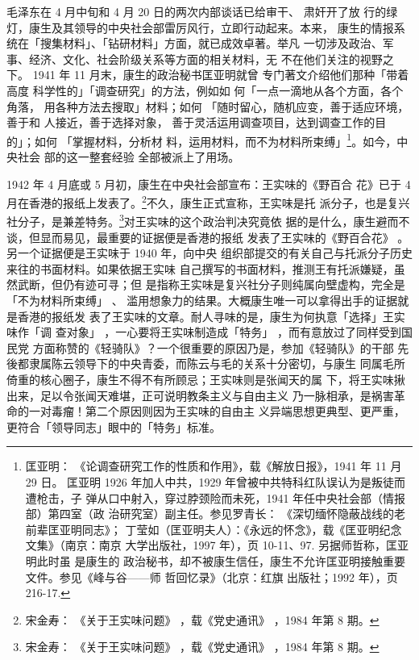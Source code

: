 毛泽东在 4 月中旬和 4 月 20 日的两次内部谈话已给审干、 肃奸开了放 行的绿
灯，康生及其领导的中央社会部雷厉风行，立即行动起来。本来， 康生的情报系
统在「搜集材料」、「钻研材料」方面，就已成效卓著。举凡  一切涉及政治、军
事、经济、文化、社会阶级关系等方面的相关材料，无 不在他们关注的视野之下。
1941 年 11 月末，康生的政治秘书匡亚明就曾 专门著文介绍他们那种「带着高度
科学性的」「调查研究」的方法，例如如 何「一点一滴地从各个方面，各个角落，
用各种方法去搜取」材料；如何 「随时留心，随机应变，善于适应环境，善于和
人接近，善于选择对象， 善于灵活运用调查项目，达到调查工作的目的」；如何
「掌握材料，分析材 料，运用材料，而不为材料所束缚」\footnote{匡亚明：
《论调查研究工作的性质和作用》，载《解放日报》，1941 年 11 月 29 日。
匡亚明 1926 年加人中共，1929 年曾被中共特科红队误认为是叛徒而遭枪击，子
弹从口中射入，穿过脖颈险而未死，1941 年任中央社会部（情报部）第四室（政
治研究室）副主任。参见罗青长： 《深切缅怀隐蔽战线的老前辈匡亚明同志》；
丁莹如（匡亚明夫人）：《永远的怀念》，载《匡亚明纪念文集》（南京：南京
大学出版社，1997 年），页 10-11、97. 另据师哲称，匡亚明此时虽 是康生的
政治秘书，却不被康生信任，康生不允许匡亚明接触重要文件。参见《峰与谷——师
哲回忆录》（北京：红旗 出版社；1992 年），页 216-17. }。如今，中央社会
部的这一整套经验 全部被派上了用场。

1942 年 4 月底或 5 月初，康生在中央社会部宣布：王实味的《野百合
花》已于 4 月在香港的报纸上发表了。\footnote{宋金寿：
《关于王实味问题》
，载《党史通讯》
，1984 年第 8 期。}不久，康生正式宣称，王实味是托
派分子，也是复兴社分子，是兼差特务。\footnote{宋金寿：
《关于王实味问题》
，载《党史通讯》
，1984 年第 8 期。}对王实味的这个政治判决究竟依
据的是什么，康生避而不谈，但显而易见，最重要的证据便是香港的报纸
发表了王实味的《野百合花》
。另一个证据便是王实味于 1940 年，向中央
组织部提交的有关自己与托派分子历史来往的书面材料。如果依据王实味
自己撰写的书面材料，推测王有托派嫌疑，虽然武断，但仍有迹可寻；但
是指称王实味是复兴社分子则纯属向壁虚构，完全是「不为材料所束缚」
、
滥用想象力的结果。大概康生唯一可以拿得出手的证据就是香港的报纸发
表了王实味的文章。耐人寻味的是，康生为何执意「选择」王实味作「调
查对象」
，一心要将王实味制造成「特务」
，而有意放过了同样受到国民党
方面称赞的《轻骑队》？一个很重要的原因乃是，参加《轻骑队》的干部
先後都隶属陈云领导下的中央青委，而陈云与毛的关系十分密切，与康生
同属毛所倚重的核心圈子，康生不得不有所顾忌；王实味则是张闻天的属
下，将王实味揪出来，足以令张闻天难堪，正可说明教条主义与自由主义
乃一脉相承，是祸害革命的一对毒瘤！第二个原因则因为王实味的自由主
义异端思想更典型、更严重，更符合「领导同志」眼中的「特务」标准。

